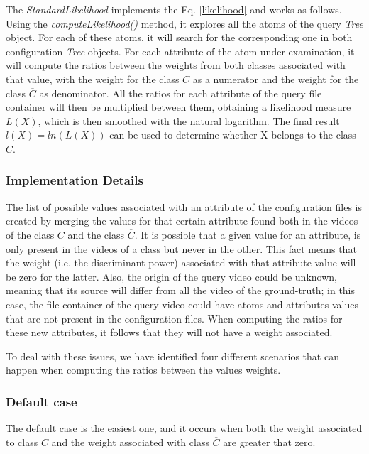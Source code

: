 The \emph{StandardLikelihood} implements the Eq. \ref{likelihood} and works as follows. Using the \emph{computeLikelihood()} method, it explores all the atoms of the query \emph{Tree} object. For each of these atoms, it will search for the corresponding one in both configuration \emph{Tree} objects. For each attribute of the atom under examination, it will compute the ratios between the weights from both classes associated with that value, with the weight for the class $C$ as a numerator and the weight for the class $\overline{C}$ as denominator. All the ratios for each attribute of the query file container will then be multiplied between them, obtaining a likelihood measure $L(X)$, which is then smoothed with the natural logarithm. 
The final result $l(X) = ln(L(X))$ can be used to determine whether X belongs to the class $C$.


\subsubsection*{Implementation Details}

The list of possible values associated with an attribute of the configuration files is created by merging the values for that certain attribute found both in the videos of the class $C$ and the class $\overline{C}$. It is possible that a given value for an attribute, is only present in the videos of a class but never in the other. This fact means that the weight (i.e. the discriminant power) associated with that attribute value will be zero for the latter.
Also, the origin of the query video could be unknown, meaning that its source will differ from all the video of the ground-truth; in this case, the file container of the query video could have atoms and attributes values that are not present in the configuration files. When computing the ratios for these new attributes, it follows that they will not have a weight associated.

To deal with these issues, we have identified four different scenarios that can happen when computing the ratios between the values weights.

\subsubsection*{Default case}

The default case is the easiest one, and it occurs when both the weight associated to class $C$ and the weight associated with class $\overline{C}$ are greater that zero.


